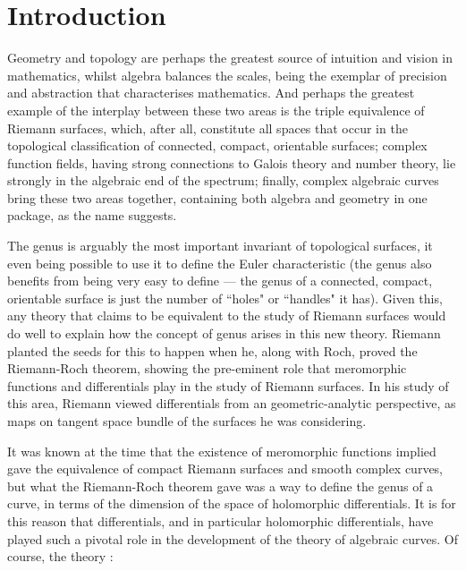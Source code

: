 \chapter{Introduction} \label{Chapter:introduction}


Geometry and topology are perhaps the greatest source of intuition and vision in mathematics, whilst algebra balances the scales, being the exemplar of precision and abstraction that characterises mathematics. 
And perhaps the greatest example of the interplay between these two areas is the triple equivalence of Riemann surfaces, which, after all, constitute all spaces that occur in the topological classification of connected, compact, orientable surfaces; complex function fields, having strong connections to Galois theory and number theory, lie strongly in the algebraic end of the spectrum; finally, complex algebraic curves bring these two areas together, containing both algebra and geometry in one package, as the name suggests.

The genus is arguably the most important invariant of topological surfaces, it even being possible to use it to define the Euler characteristic (the genus also benefits from being very easy to define --- the genus of a connected, compact, orientable surface is just the number of ``holes" or ``handles" it has).
Given this, any theory that claims to be equivalent to the study of Riemann surfaces would do well to explain how the concept of genus arises in this new theory.
Riemann planted the seeds for this to happen when he, along with Roch, proved the Riemann-Roch theorem, showing the pre-eminent role that meromorphic functions and differentials play in the study of Riemann surfaces.
In his study of this area, Riemann viewed differentials from an geometric-analytic perspective, as maps on tangent space bundle of the surfaces he was considering.

It was known at the time that the existence of meromorphic functions implied gave the equivalence of compact Riemann surfaces and smooth complex curves, but what the Riemann-Roch theorem gave was a way to define the genus of a curve, in terms of the dimension of the space of holomorphic differentials.
It is for this reason that differentials, and in particular holomorphic differentials, have played such a pivotal role in the development of the theory of algebraic curves.
Of course, the theory :

